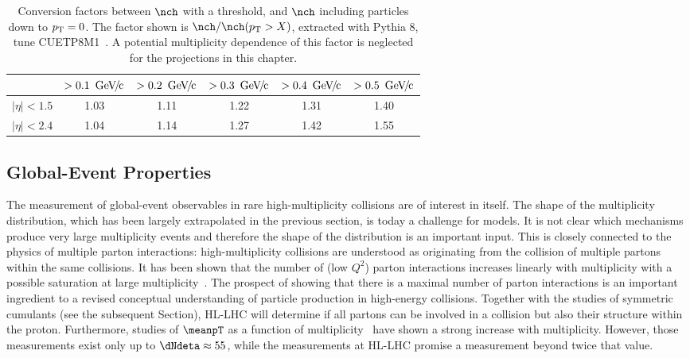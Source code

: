 \documentclass[../report.tex]{subfiles}
\begin{document}
\begin{table}
\centering
\begin{tabular}{c|c|c|c|c|c}
\backslashbox{$|\eta|$}{$\pT$} & $> \unit[0.1]{\UGeVc}$ & $> \unit[0.2]{\UGeVc}$ & $> \unit[0.3]{\UGeVc}$ & $> \unit[0.4]{\UGeVc}$ & $> \unit[0.5]{\UGeVc}$ \\
\hline
$|\eta| < 1.5$ & 1.03 & 1.11 & 1.22 & 1.31 & 1.40 \\
\hline
$|\eta| < 2.4$ & 1.04 & 1.14 & 1.27 & 1.42 & 1.55 \\
\hline
\end{tabular}
\caption{Conversion factors between $\nch$ with a \pT threshold, and $\nch$ including particles down to $p\sb{\scriptstyle\mathrm{T}} = 0$. The factor shown is $\nch / \nch(\pT > X)$, extracted with Pythia 8, tune CUETP8M1~\cite{Khachatryan:2015pea}. A potential multiplicity dependence of this factor is neglected for the projections in this chapter.}
\label{tab:smallsystems_conversion}
\end{table}

\subsection{Global-Event Properties}
\label{sect:smallsystems_global}
  
The measurement of global-event observables in rare high-multiplicity \pp collisions are of interest in itself. The shape of the multiplicity distribution, which has been largely extrapolated in the previous section, is today a challenge for models. It is not clear which mechanisms produce very large multiplicity events and therefore the shape of the distribution is an important input. 
This is closely connected to the physics of multiple parton interactions: high-multiplicity collisions are understood as originating from the collision of multiple partons within the same \pp collisions. It has been shown that the number of (low $Q^2$) parton interactions increases linearly with multiplicity with a possible saturation at large multiplicity~\cite{Abelev:2013sqa}. The prospect of showing that there is a maximal number of parton interactions is an important ingredient to a revised conceptual understanding of particle production in high-energy \pp collisions. Together with the studies of symmetric cumulants (see the subsequent Section), HL-LHC will determine if all partons can be involved in a collision but also their structure within the proton.
Furthermore, studies of $\meanpT$ as a function of multiplicity~\cite{Abelev:2013bla} have shown a strong increase with multiplicity. However, those measurements exist only up to $\dNdeta \approx 55$, while the measurements at HL-LHC promise a measurement beyond twice that value. 
\end{document}
